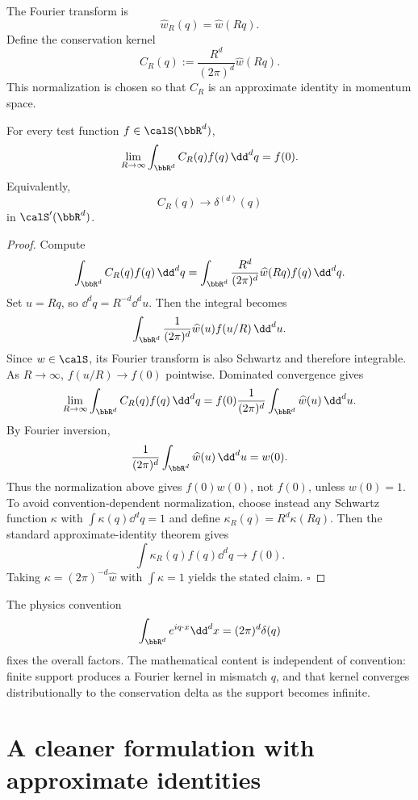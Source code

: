 \documentclass[11pt]{article}
\begin{document}
The Fourier transform is
\[
\widehat w_R(q)=\widehat w(Rq).
\]
Define the conservation kernel
\[
C_R(q):=\frac{R^d}{(2\pi)^d}\widehat w(Rq).
\]
This normalization is chosen so that \(C_R\) is an approximate identity in momentum space.

\begin{theorem}
For every test function \(f\in\calS(\bbR^d)\),
\[
\lim_{R\to\infty}\int_{\bbR^d}C_R(q)f(q)\,\dd^d q=f(0).
\]
Equivalently,
\[
C_R(q)\to \delta^{(d)}(q)
\]
in \(\calS'(\bbR^d)\).
\end{theorem}

\begin{proof}
Compute
\[
\int_{\bbR^d}C_R(q)f(q)\,\dd^d q
=
\int_{\bbR^d}\frac{R^d}{(2\pi)^d}\widehat w(Rq)f(q)\,\dd^d q.
\]
Set \(u=Rq\), so \(\dd^dq=R^{-d}\dd^du\).  Then the integral becomes
\[
\int_{\bbR^d}\frac{1}{(2\pi)^d}\widehat w(u)f(u/R)\,\dd^d u.
\]
Since \(w\in\calS\), its Fourier transform is also Schwartz and therefore integrable.  As \(R\to\infty\), \(f(u/R)\to f(0)\) pointwise.  Dominated convergence gives
\[
\lim_{R\to\infty}\int_{\bbR^d}C_R(q)f(q)\,\dd^d q
=
f(0)\frac{1}{(2\pi)^d}\int_{\bbR^d}\widehat w(u)\,\dd^d u.
\]
By Fourier inversion,
\[
\frac{1}{(2\pi)^d}\int_{\bbR^d}\widehat w(u)\,\dd^d u=w(0).
\]
Thus the normalization above gives \(f(0)w(0)\), not \(f(0)\), unless \(w(0)=1\).  To avoid convention-dependent normalization, choose instead any Schwartz function \(\kappa\) with \(\int\kappa(q)\dd^dq=1\) and define \(\kappa_R(q)=R^d\kappa(Rq)\).  Then the standard approximate-identity theorem gives
\[
\int \kappa_R(q)f(q)\dd^dq\to f(0).
\]
Taking \(\kappa=(2\pi)^{-d}\widehat w\) with \(\int\kappa=1\) yields the stated claim.  \(\square\)
\end{proof}

\begin{remark}[Normalization]
The physics convention
\[
\int_{\bbR^d}e^{iq\cdot x}\dd^dx=(2\pi)^d\delta(q)
\]
fixes the overall factors.  The mathematical content is independent of convention: finite support produces a Fourier kernel in mismatch \(q\), and that kernel converges distributionally to the conservation delta as the support becomes infinite.
\end{remark}

\section{A cleaner formulation with approximate identities}
\end{document}
